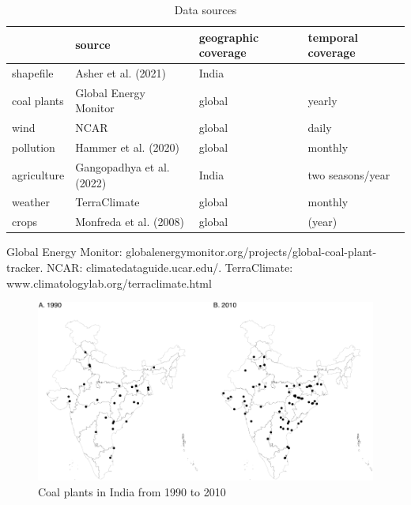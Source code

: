 \documentclass[
]{article}
\begin{document}
\begin{table}[H]

\caption{\label{tab:data}Data sources}
\centering
\begin{threeparttable}
\begin{tabular}[t]{>{\raggedright\arraybackslash}p{2cm}>{\centering\arraybackslash}p{5cm}>{\centering\arraybackslash}p{3cm}>{\centering\arraybackslash}p{3cm}}
\toprule
  & source & geographic coverage & temporal coverage\\
\midrule
shapefile & Asher et al. (2021) & India & \\
coal plants & Global Energy Monitor & global & yearly\\
wind & NCAR & global & daily\\
pollution & Hammer et al. (2020) & global & monthly\\
agriculture & Gangopadhya et al. (2022) & India & two seasons/year\\
weather & TerraClimate & global & monthly\\
crops & Monfreda et al. (2008) & global & 2000 (year)\\
\bottomrule
\end{tabular}
\begin{tablenotes}[para]
\item Global Energy Monitor: globalenergymonitor.org/projects/global-coal-plant-tracker. NCAR: climatedataguide.ucar.edu/. TerraClimate: www.climatologylab.org/terraclimate.html
\end{tablenotes}
\end{threeparttable}
\end{table}

\FloatBarrier
\newpage

\begin{figure}
\includegraphics{draft_files/figure-latex/plants-1} \caption[Coal plants in India from 1990 to 2010]{Coal plants in India from 1990 to 2010}\label{fig:plants}
\end{figure}
\end{document}

